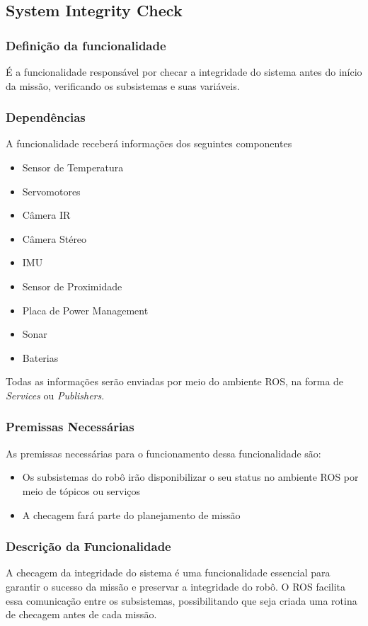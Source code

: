 \subsection{System Integrity Check}
\label{ssec:check}

\subsubsection{Definição da funcionalidade}
É a funcionalidade responsável por checar a integridade do sistema antes do início da missão, verificando os subsistemas e suas variáveis.

\subsubsection{Dependências}
A funcionalidade receberá informações dos seguintes componentes
\begin{itemize}
	\item Sensor de Temperatura
	\item Servomotores
	\item Câmera IR
	\item Câmera Stéreo
	\item IMU
	\item Sensor de Proximidade
	\item Placa de Power Management
	\item Sonar 
	\item Baterias
\end{itemize}

Todas as informações serão enviadas por meio do ambiente ROS, na forma de \textit{Services} ou \textit{Publishers}.

\subsubsection{Premissas Necessárias}
As premissas necessárias para o funcionamento dessa funcionalidade são:
\begin{itemize}
	\item Os subsistemas do robô irão disponibilizar o seu status no ambiente ROS por meio de tópicos ou serviços
	\item A checagem fará parte do planejamento de missão
\end{itemize}

\subsubsection{Descrição da Funcionalidade}
A checagem da integridade do sistema é uma funcionalidade essencial para garantir o sucesso da missão e preservar a integridade do robô. O ROS facilita essa comunicação entre os subsistemas, possibilitando que seja criada uma rotina de checagem antes de cada missão.

